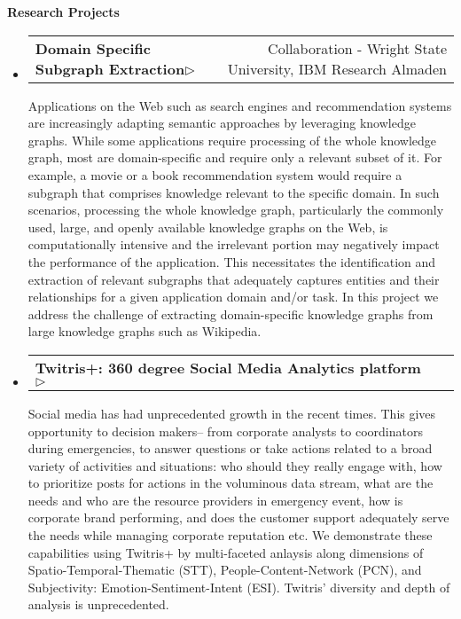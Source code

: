 \documentclass[letterpaper,9pt]{article}
\makeatletter
\newcommand{\resheading}[1]{{\large \colorbox{mygrey}{\begin{minipage}{\textwidth}{\textbf{#1 \vphantom{p\^{E}}}}\end{minipage}}}}
\newcommand{\resprojectheading}[2]{
\begin{tabular*}{7.0in}{l@{\extracolsep{\fill}}r}
		\textbf{#1} & #2\\
\end{tabular*}\vspace{-6pt}}
\makeatother
\begin{document}
\resheading{Research Projects}
\begin{itemize}
\item
\resprojectheading{Domain Specific Subgraph Extraction{$\triangleright$}}{Collaboration - Wright State University, IBM Research Almaden}
	\vspace{0.1in}

\justify
\hspace{1em} Applications on the Web such as search engines and recommendation systems are increasingly adapting semantic approaches by leveraging knowledge graphs. While some applications require processing of the whole knowledge graph, most are domain-specific and require only a relevant subset of it. For example, a movie or a book recommendation system would require a subgraph that comprises knowledge relevant to the specific domain. In such scenarios, processing the whole knowledge graph, particularly the commonly used, large, and openly available knowledge graphs on the Web, is computationally intensive and the irrelevant portion may negatively impact the performance of the application. This necessitates the identification and extraction of relevant subgraphs that adequately captures entities and their relationships for a given application domain and/or task. In this project we address the challenge of extracting domain-specific knowledge graphs from large knowledge graphs such as Wikipedia. 

\item
\resprojectheading{Twitris+: 360 degree Social Media Analytics platform \href{http://twitris.knoesis.org/}{$\triangleright$}}{}
	\vspace{0.1in}

\justify
\hspace{1em} Social media has had unprecedented growth in the recent times. This gives opportunity to decision makers-- from corporate analysts to coordinators during emergencies, to answer questions or take actions related to a broad variety of activities and situations: who should they really engage with, how to prioritize posts for actions in the voluminous data stream, what are the needs and who are the resource providers in emergency event, how is corporate brand performing, and does the customer support adequately serve the needs while managing corporate reputation etc. We demonstrate these capabilities using Twitris+ by multi-faceted anlaysis along dimensions of Spatio-Temporal-Thematic (STT), People-Content-Network (PCN), and Subjectivity: Emotion-Sentiment-Intent (ESI). Twitris' diversity and depth of analysis is unprecedented. 


\end{itemize}
\end{document}
